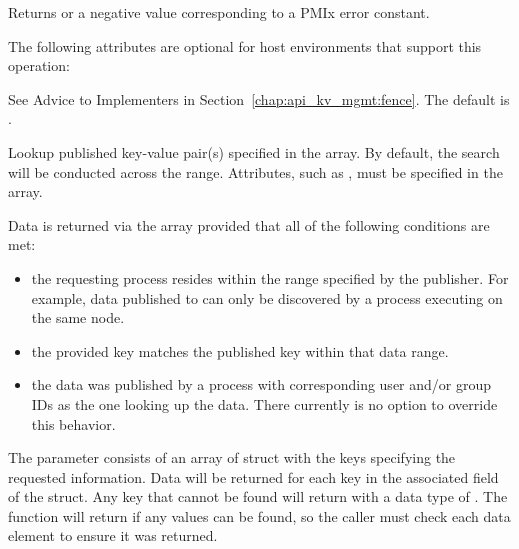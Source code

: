 \begin{arglist}
\end{arglist}

Returns  or a negative value corresponding to a PMIx error constant.

\optattrstart
The following attributes are optional for host environments that support this operation:

See Advice to Implementers in Section~\ref{chap:api_kv_mgmt:fence}.
\pastePRIAttributeItemEnd
{}
The default is .
\pastePRIAttributeItemEnd
{}

\optattrend

\descr

Lookup published key-value pair(s) specified in the  array.
By default, the search will be conducted across the  range.
Attributes, such as , must be specified in the  array.

Data is returned via the  array provided that all of the following conditions are met:
\begin{itemize}
    \item the requesting process resides within the range specified by the publisher. For example, data published to  can only be discovered by a process executing on the same node.
    \item the provided key matches the published key within that data range.
    \item the data was published by a process with corresponding user and/or group IDs as the one looking up the data. There currently is no option to override this behavior.
\end{itemize}

The  parameter consists of an array of  struct with the keys specifying the requested information.
Data will be returned for each key in the associated  field of the  struct.
Any key that cannot be found will return with a data type of .
The function will return  if any values can be found, so the caller must check each data element to ensure it was returned.

